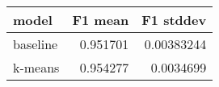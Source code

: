 \begin{tabular}{lrr}
\toprule
 model    &   F1 mean &   F1 stddev \\
\midrule
 baseline &  0.951701 &  0.00383244 \\
 k-means  &  0.954277 &  0.0034699  \\
\bottomrule
\end{tabular}